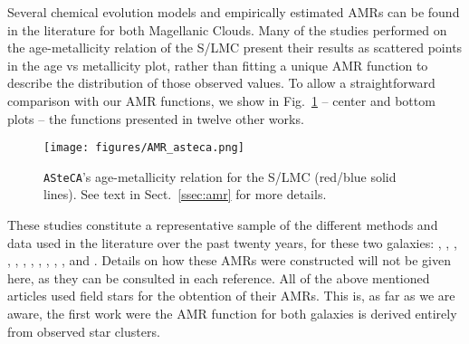 \documentclass{aa}
\begin{document}
Several chemical evolution models and empirically estimated AMRs can be found in
the literature for both Magellanic Clouds. Many of the studies performed on the
age-metallicity relation of the S/LMC present their results as scattered points
in the age vs metallicity plot, rather than fitting a unique AMR function to
describe the distribution of those observed values.
%
To allow a straightforward comparison with our AMR functions, we show in
Fig.~\ref{fig:amr} -- center and bottom plots -- the functions presented in
twelve other works.

\begin{figure}
\centering
\texttt{[image: figures/AMR\_asteca.png]}
\caption{\texttt{ASteCA}'s age-metallicity relation for the S/LMC (red/blue
solid lines). 
See text in Sect.~\ref{ssec:amr} for more details.}
\label{fig:amr}
\end{figure}

These studies constitute a representative sample of the different methods and
data used in the literature over the past twenty years, for these two
galaxies:
\citet[][PT98; bursting models]{Pagel_1998}, \citet[][G98; closed-box model
with Holtzman SFH]{Geha_1998}, \citet[][HZ04]{Harris_2004}, \citet[][C08a;
average of four disk frames]{Carrera_2008_lmc}, \citet[][C08b; average of
thirteen frames]{Carrera_2008_smc}, \citet[][HZ09]{Harris_2009}, \citet[][N09;
5th degree polynomial fit to the AMRs of their three observed regions]
{Noel_2009}, \citet[][TB09; 1: no merger model, 2: equal mass merger, 3: one
to four merger]{Tsujimoto_2009}, \citet[][R12; four tiles average]{Rubele_2012},
\citet[][C13; B: Bologna, C: Cole]{Cignoni_2013}, \citet[][PG13]
{Piatti_Geisler_2013}, and \citet[][M14; 0: field LMC0, 1: field LMC1 , 2: field
LMC2]{Meschin_2014}.
Details on how these AMRs were constructed will not be given here, as
they can be consulted in each reference.
%
All of the above mentioned articles used field stars for the obtention
of their AMRs. This is, as far as we are aware, the first work were the AMR
function for both galaxies is derived entirely from observed star clusters.

\end{document}
